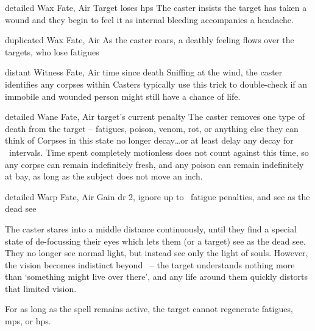   {detailed}%
  {Wax}%
  {Fate, Air}%
  {}%
  {Target loses  \glspl{hp}}%
  {The caster insists the target has taken a wound and they begin to feel it as internal bleeding accompanies a headache.}

  {duplicated}%
  {Wax}%
  {Fate, Air}%
  {}%
  {As the caster roars, a deathly feeling flows over the targets, who lose  \glspl{fatigue}}%
  {}

  {distant}%
  {Witness}%
  {Fate, Air}%
  {time since death}%
  {Sniffing at the wind, the caster identifies any corpses within \spellRange}%
  {
    Casters typically use this trick to double-check if an immobile and wounded person might still have a chance of life.
  }

  {detailed}%
  {Wane}%
  {Fate, Air}%
  {target's current  penalty}%
  {The caster removes one type of death from the target -- \glspl{fatigue}, poison, venom, rot, or anything else they can think of}%
  {Corpses in this state no longer decay\ldots or at least delay any decay for ~\glspl{interval}. 
    Time spent completely motionless does not count against this time, so any corpse can remain indefinitely fresh, and any poison can remain indefinitely at bay, as long as the subject does not move an inch.
  }

  {detailed}%
  {Warp}%
  {Fate, Air}%
  {}%
  {Gain \gls{dr} 2, ignore up to ~\gls{fatigue} penalties, and see as the dead see}%
  {
    The caster stares into a middle distance continuously, until they find a special state of de-focussing their eyes which lets them (or a target) see as the dead see.
    They no longer see normal light, but instead see only the light of souls.
    However, the vision becomes indistinct beyond \spellRange\ -- the target understands nothing more than `something might live over there', and any life around them quickly distorts that limited vision.

    For as long as the spell remains active, the target cannot regenerate \glspl{fatigue}, \glspl{mp}, or \glspl{hp}.
  }
